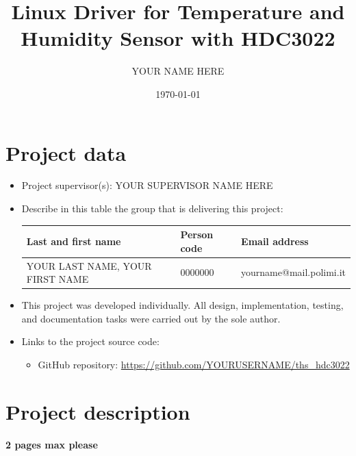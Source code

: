 \documentclass[10pt,a4]{article}
\author{YOUR NAME HERE}
\date{\today}
\title{Linux Driver for Temperature and Humidity Sensor with HDC3022}
\begin{document}
\maketitle
\tableofcontents

\section{Project data}

\begin{itemize}
\item
  Project supervisor(s): YOUR SUPERVISOR NAME HERE

\item
Describe in this table the group that is delivering this project:

\begin{center}
\begin{tabular}{lll}
Last and first name & Person code & Email address\\
\hline
  YOUR LAST NAME, YOUR FIRST NAME & 0000000 & yourname@mail.polimi.it \\
\end{tabular}
\end{center}

\item
This project was developed individually. All design, implementation, testing,
and documentation tasks were carried out by the sole author.

\item Links to the project source code:
\begin{itemize}
  \item GitHub repository: \url{https://github.com/YOURUSERNAME/ths_hdc3022}
\end{itemize}

\end{itemize}


\section{Project description}

\textbf{2 pages max please}
\end{document}
